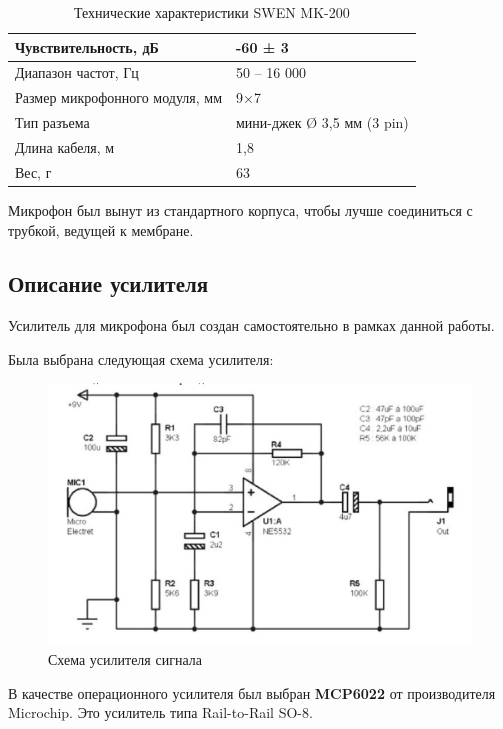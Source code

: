 \begin{table}[h]
\centering
\label{my-label}
\begin{tabular}{|l|l|}
\hline
Чувствительность, дБ           & -60 ± 3                    \\ \hline
Диапазон частот, Гц            & 50 – 16 000                \\ \hline
Размер микрофонного модуля, мм & 9×7                        \\ \hline
Тип разъема                    & мини-джек Ø 3,5 мм (3 pin) \\ \hline
Длина кабеля, м                & 1,8                        \\ \hline
Вес, г                         & 63                         \\ \hline
\end{tabular}
\caption{Технические характеристики SWEN MK-200}
\end{table}

Микрофон был вынут из стандартного корпуса, чтобы лучше соединиться с трубкой, ведущей к мембране.

\subsection{Описание усилителя}
Усилитель для микрофона был создан самостоятельно в рамках данной работы.

Была выбрана следующая схема усилителя:

\begin{figure}[H]
\centering
\includegraphics[width=14cm]{circuit.jpg}
\caption{Схема усилителя сигнала}
\end{figure}

В качестве операционного усилителя был выбран \textbf{MCP6022} от производителя Microchip. Это усилитель типа Rail-to-Rail SO-8.

